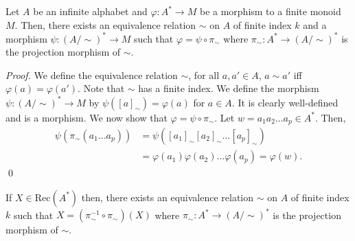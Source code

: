 \documentclass{llncs}
\begin{document}
\begin{lemma}
  Let $A$ be an infinite alphabet and $\varphi: A^* \to M$ be a morphism to a finite monoid $M$. Then, there exists an equivalence relation $\sim$ on $A$ of finite index $k$ and a morphism $\psi: (A/\sim)^* \to M$ such that $\varphi = \psi \circ \pi_\sim$ where $\pi_\sim: A^* \to (A/\sim)^*$ is the projection morphism of $\sim$. 
  \label{lem:infinitely-generated-rec-morphism}
\end{lemma}
\begin{proof}
  We define the equivalence relation $\sim$, for all $a, a' \in A$, $a \sim a'$ iff $\varphi(a) = \varphi(a')$. Note that $\sim$ has a finite index. We define the morphism $\psi: (A/\sim)^* \to M$ by $\psi([a]_\sim) = \varphi(a)$ for $a \in A$. It is clearly well-defined and is a morphism.
  We now show that $\varphi = \psi \circ \pi_\sim$.
  Let $w = a_1a_2\dots a_p \in A^*$. Then,
  \begin{align*}
    \psi(\pi_\sim(a_1 \dots a_p)) &= \psi([a_1]_\sim [a_2]_\sim \dots [a_p]_\sim) \\
    &= \varphi(a_1)\varphi(a_2) \dots \varphi(a_p) = \varphi(w).
  \end{align*}
  \qed
\end{proof}

\begin{proposition}
    If $X \in \text{Rec}(A^*)$ then, there exists an equivalence relation $\sim$ on $A$ of finite index $k$ such that $X = (\pi_\sim^{-1} \circ \pi_\sim)(X)$ where $\pi_\sim: A^* \to (A/\sim)^*$ is the projection morphism of $\sim$.
  \label{prop:pi-tilde-rec}
\end{proposition}
\end{document}
